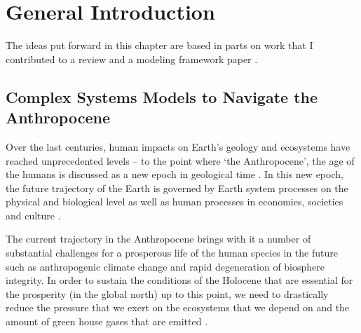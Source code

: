 \chapter{General Introduction}
\label{chapter:introduction}
The ideas put forward in this chapter are based in parts on work that I contributed to a review \citep[P2]{Mueller-Hansen2017} and a modeling framework paper \citep[P3]{Donges2018}.
\section{Complex Systems Models to Navigate the Anthropocene}
\label{sec:intro_complex_systems}
Over the last centuries, human impacts on Earth's geology and ecosystems have reached unprecedented levels -- to the point where `the Anthropocene', the age of the humans is discussed as a new epoch in geological time \citep{Crutzen2006, Zal2008, Zal2010, Steffen2011}. In this new epoch, the future trajectory of the Earth is governed by Earth system processes on the physical and biological level as well as human processes in economies, societies and culture \citep{Steffen2007, Lewis2015, Crutzen2016}.

The current trajectory in the Anthropocene brings with it a number of substantial challenges for a prosperous life of the human species in the future such as anthropogenic climate change and rapid degeneration of biosphere integrity. In order to sustain the conditions of the Holocene that are essential for the prosperity (in the global north) up to this point, we need to drastically reduce the pressure that we exert on the ecosystems that we depend on and the amount of green house gases that are emitted \citep{Rockstrom2009a, Rockstrom2009, Steffen2015a}.

